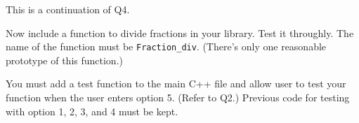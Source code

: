 This is a continuation of Q4.

Now include a function to divide fractions in your library.
Test it throughly.
The name of the function must be \verb!Fraction_div!.
(There's only one reasonable prototype of this function.)

You must add a test function to the main C++ file and allow user to test
your function when the user enters option 5. (Refer to Q2.)
Previous code for testing with option 1, 2, 3, and 4 must be kept.
